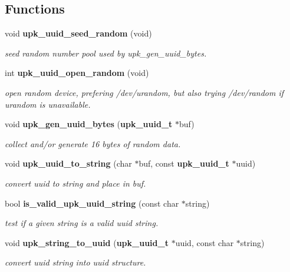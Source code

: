\subsection*{Functions}
\begin{DoxyCompactItemize}
\item 
void {\bf upk\_\-uuid\_\-seed\_\-random} (void)
\begin{DoxyCompactList}\small\item\em seed random number pool used by upk\_\-gen\_\-uuid\_\-bytes. \end{DoxyCompactList}\item 
int {\bf upk\_\-uuid\_\-open\_\-random} (void)
\begin{DoxyCompactList}\small\item\em open random device, prefering /dev/urandom, but also trying /dev/random if urandom is unavailable. \end{DoxyCompactList}\item 
void {\bf upk\_\-gen\_\-uuid\_\-bytes} ({\bf upk\_\-uuid\_\-t} $\ast$buf)
\begin{DoxyCompactList}\small\item\em collect and/or generate 16 bytes of random data. \end{DoxyCompactList}\item 
void {\bf upk\_\-uuid\_\-to\_\-string} (char $\ast$buf, const {\bf upk\_\-uuid\_\-t} $\ast$uuid)
\begin{DoxyCompactList}\small\item\em convert uuid to string and place in buf. \end{DoxyCompactList}\item 
bool {\bf is\_\-valid\_\-upk\_\-uuid\_\-string} (const char $\ast$string)
\begin{DoxyCompactList}\small\item\em test if a given string is a valid uuid string. \end{DoxyCompactList}\item 
void {\bf upk\_\-string\_\-to\_\-uuid} ({\bf upk\_\-uuid\_\-t} $\ast$uuid, const char $\ast$string)
\begin{DoxyCompactList}\small\item\em convert uuid string into uuid structure. \end{DoxyCompactList}\end{DoxyCompactItemize}

